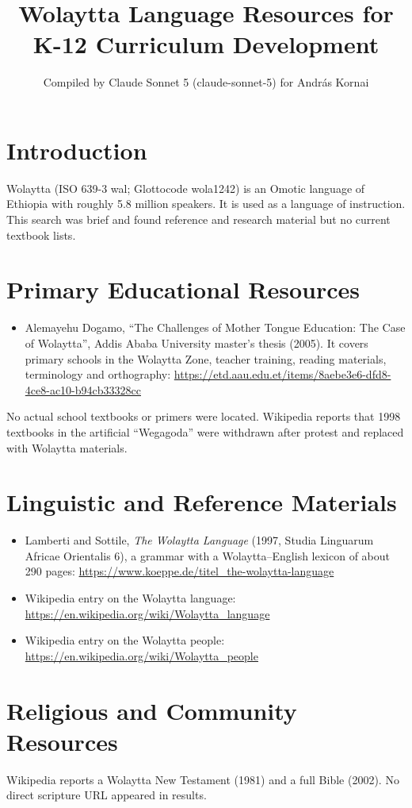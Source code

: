 \documentclass[12pt]{article}
\title{Wolaytta Language Resources for K-12 Curriculum Development}
\author{Compiled by Claude Sonnet 5 (claude-sonnet-5) for Andr\'as Kornai}
\date{}
\begin{document}
\maketitle

\section{Introduction}
Wolaytta (ISO 639-3 wal; Glottocode wola1242) is an Omotic language of Ethiopia with roughly 5.8 million speakers. It is used as a language of instruction. This search was brief and found reference and research material but no current textbook lists.

\section{Primary Educational Resources}
\begin{itemize}
\item Alemayehu Dogamo, ``The Challenges of Mother Tongue Education: The Case of Wolaytta'', Addis Ababa University master's thesis (2005). It covers primary schools in the Wolaytta Zone, teacher training, reading materials, terminology and orthography: \url{https://etd.aau.edu.et/items/8aebe3e6-dfd8-4ce8-ac10-b94cb33328cc}
\end{itemize}
No actual school textbooks or primers were located. Wikipedia reports that 1998 textbooks in the artificial ``Wegagoda'' were withdrawn after protest and replaced with Wolaytta materials.

\section{Linguistic and Reference Materials}
\begin{itemize}
\item Lamberti and Sottile, \emph{The Wolaytta Language} (1997, Studia Linguarum Africae Orientalis 6), a grammar with a Wolaytta--English lexicon of about 290 pages: \url{https://www.koeppe.de/titel_the-wolaytta-language}
\item Wikipedia entry on the Wolaytta language: \url{https://en.wikipedia.org/wiki/Wolaytta_language}
\item Wikipedia entry on the Wolaytta people: \url{https://en.wikipedia.org/wiki/Wolaytta_people}
\end{itemize}

\section{Religious and Community Resources}
Wikipedia reports a Wolaytta New Testament (1981) and a full Bible (2002). No direct scripture URL appeared in results.
\end{document}
